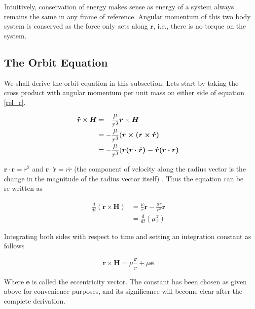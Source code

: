 \documentclass{article}
\theoremstyle{definition}
\begin{document}
Intuitively, conservation of energy makes sense as energy of a system always remains the same in any frame of reference. Angular momentum of this two body system is conserved as the force only acts along $\boldsymbol{r}$, i.e., there is no torque on the system. 

\subsection{The Orbit Equation}
We shall derive the orbit equation in this subsection. 
Lets start by taking the cross product with angular momentum per unit mass on either side of equation \ref{rel_r}.

\begin{equation}
\begin{split}
    \Ddot{\boldsymbol{r}}\times \boldsymbol{H} & = -\frac{\mu}{r^3}\boldsymbol{r} \times \boldsymbol{H}\\
    & = -\frac{\mu}{r^3}(\boldsymbol{r\times(r\times \Dot{r})}\\
    & = -\frac{\mu}{r^3}(\boldsymbol{r(r\cdot \Dot{r}) - \Dot{r}(r\cdot r)}
\end{split}
\end{equation}

$\boldsymbol{r\cdot r}= r^2$ and $\boldsymbol{r\cdot \Dot{r}}= r\Dot{r}$ (the component of velocity along the radius vector is the change in the magnitude of the radius vector itself) . Thus the equation can be re-written as

\begin{equation}
\begin{split}
    \frac{d}{dt}(\boldsymbol{\Dot{r}\times H}) & = \frac{\mu}{r}\boldsymbol{\Dot{r}} - \frac{\mu \Dot{r}}{r^2}\boldsymbol{r}\\
    & = \frac{d}{dt}(\mu \frac{\boldsymbol{r}}{r})
\end{split}
\end{equation}

Integrating both sides with respect to time and setting an integration constant as follows

\begin{equation}\label{e}
   \boldsymbol{\Dot{r}\times H} = \mu \frac{\boldsymbol{r}}{r} + \mu\boldsymbol{e} 
\end{equation}


Where $\boldsymbol{e}$ is called the eccentricity vector. The constant has been chosen as given above for convenience purposes, and its significance will become clear after the complete derivation.
\end{document}
